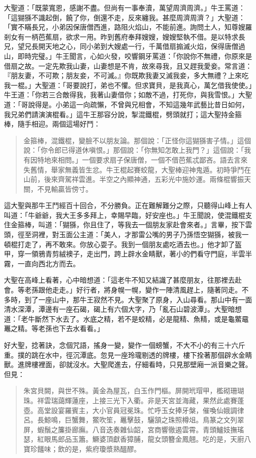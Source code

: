 大聖道：「既蒙寬恩，感謝不盡。但尚有一事奉瀆，萬望周濟周濟。」牛王罵道：「這猢猻不識起倒，饒了你，倒還不走，反來纏我。甚麼周濟周濟？」大聖道：「實不瞞長兄，小弟因保唐僧西進，路阻火焰山，不能前進。詢問土人，知尊嫂羅剎女有一柄芭蕉扇，欲求一用。昨到舊府奉拜嫂嫂，嫂嫂堅執不借。是以特求長兄，望兄長開天地之心，同小弟到大嫂處一行，千萬借扇搧滅火焰，保得唐僧過山，即時完璧。」牛王聞言，心如火發，咬響鋼牙罵道：「你說你不無禮，你原來是借扇之故。一定先欺我山妻，山妻想是不肯，故來尋我，且又趕我愛妾。常言道：『朋友妻，不可欺；朋友妾，不可滅。』你既欺我妻又滅我妾，多大無禮？上來吃我一棍。」大聖道：「哥要說打，弟也不懼。但求寶貝，是我真心，萬乞借我使使。」牛王道：「你若三合敵得我，我著山妻借你；如敵不過，打死你，與我雪恨。」大聖道：「哥說得是。小弟這一向疏懶，不曾與兄相會，不知這幾年武藝比昔日如何，我兄弟們請演演棍看。」這牛王那容分說，掣混鐵棍，劈頭就打；這大聖持金箍棒，隨手相迎。兩個這場好鬥：
\begin{quote}
金箍棒，混鐵棍，變臉不以朋友論。那個說：「正怪你這猢猻害子情。」這個說：「你令郎已得道休嗔恨。」那個說：「你無知怎敢上我門？」這個說：「我有因特地來相問。」一個要求扇子保唐僧，一個不借芭蕉忒鄙吝。語去言來失舊情，舉家無義皆生忿。牛王棍起賽蛟龍，大聖棒迎神鬼遁。初時爭鬥在山前，後來齊駕祥雲進。半空之內顯神通，五彩光中施妙運。兩條棍響振天關，不見輸贏皆傍寸。
\end{quote}

這大聖與那牛王鬥經百十回合，不分勝負。正在難解難分之際，只聽得山峰上有人叫道：「牛爺爺，我大王多多拜上，幸賜早臨，好安座也。」牛王聞說，使混鐵棍支住金箍棒，叫道：「猢猻，你且住了，等我去一個朋友家赴會來者。」言畢，按下雲頭，徑至洞裡，對玉面公主道：「美人，才那雷公嘴的男子乃孫悟空猢猻，被我一頓棍打走了，再不敢來。你放心耍子。我到一個朋友處吃酒去也。」他才卸了盔甲，穿一領鴉青剪絨襖子，走出門，跨上辟水金睛獸，著小的們看守門庭，半雲半霧，一直向西北方而去。

大聖在高峰上看著，心中暗想道：「這老牛不知又結識了甚麼朋友，往那裡去赴會。等老孫跟他走走。」好行者，將身幌一幌，變作一陣清風趕上，隨著同走。不多時，到了一座山中，那牛王寂然不見。大聖聚了原身，入山尋看。那山中有一面清水深潭，潭邊有一座石碣，碣上有六個大字，乃「亂石山碧波潭」。大聖暗想道：「老牛斷然下水去了。水底之精，若不是蛟精，必是龍精、魚精，或是龜鱉黿鼉之精。等老孫也下去水看看。」

好大聖，捻著訣，念個咒語，搖身一變，變作一個螃蟹，不大不小的有三十六斤重。撲的跳在水中，徑沉潭底。忽見一座玲瓏剔透的牌樓，樓下拴著那個辟水金睛獸。進牌樓裡面，卻就沒水。大聖爬進去，仔細看時，只見那壁廂一派音樂之聲。但見：
\begin{quote}
朱宮貝闕，與世不殊。黃金為屋瓦，白玉作門樞。屏開玳瑁甲，檻砌珊瑚珠。祥雲瑞藹輝蓮座，上接三光下入衢。非是天宮並海藏，果然此處賽蓬壺。高堂設宴羅賓主，大小官員冠冕珠。忙呼玉女捧牙槃，催喚仙娥調律呂。長鯨鳴，巨蟹舞，鱉吹笙，鼉擊鼓，驪頷之珠照樽俎。鳥篆之文列翠屏，蝦鬚之簾掛廊廡。八音迭奏雜仙韶，宮商響徹遏雲霄。青頭鱸妓撫瑤瑟，紅眼馬郎品玉簫。鱖婆頂獻香獐脯，龍女頭簪金鳳翹。吃的是，天廚八寶珍饈味；飲的是，紫府瓊漿熟醞醪。
\end{quote}

